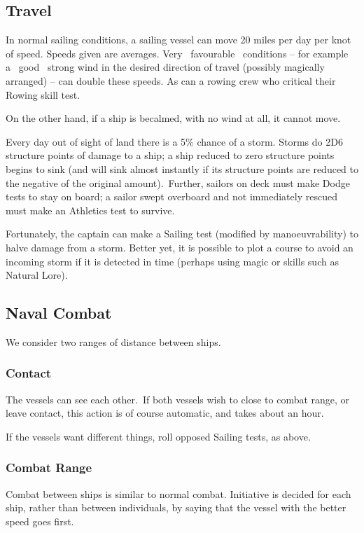 \subsection{Travel}
In normal sailing conditions, a sailing vessel can move 20 miles per day per knot of speed. Speeds given are averages. Very  favourable  conditions – for example a  good  strong wind in the desired direction of travel (possibly magically arranged) – can double these speeds. As can a rowing crew who critical their Rowing skill test. 

On the other hand, if a ship is becalmed, with no wind at all, it cannot move.

Every day out of sight of land there is a 5\% chance of a storm. Storms do 2D6 structure points of damage to a ship; a ship reduced to zero structure points begins to sink (and will sink almost instantly if its structure points are reduced to the negative of the original amount). Further, sailors on deck must make Dodge tests to stay on board; a sailor swept overboard and not immediately rescued must make an Athletics test to survive.

Fortunately, the captain can make a Sailing test (modified by manoeuvrability) to halve damage from a storm. Better yet, it is possible to plot a course to avoid an incoming storm if it is detected in time (perhaps using magic or skills such as Natural Lore).

\subsection{Naval Combat}
We consider two ranges of distance between ships.

\subsubsection{Contact}
The vessels can see each other. If both vessels wish to close to combat range, or leave contact, this action is of course automatic, and takes about an hour.

If the vessels want different things, roll opposed Sailing tests, as above.

\subsubsection{Combat Range}
Combat between ships is similar to normal combat. Initiative is decided for each ship, rather than between individuals, by saying that the vessel with the better speed goes first.  

